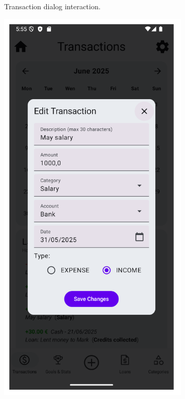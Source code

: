 \documentclass[a4paper,12pt]{article}
\begin{document}
\begin{figure}[H]
\begin{subfigure}[b]{0.23\textwidth}
        \caption{Transaction dialog interaction.}
        \label{fig:transaction_edit_delete_dialog}
    \end{subfigure}
    \hfill
    \begin{subfigure}[b]{0.23\textwidth}
        \includegraphics[width=\textwidth]{transactions_edit_dialog.png}

\end{subfigure}
\end{figure}
\end{document}
